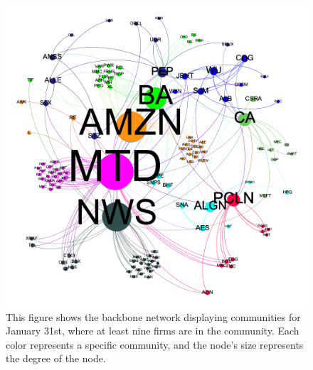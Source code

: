\begin{figure}[htb!]
  \centerline{\includegraphics[scale=0.5]{figures/EarnAnnounceTE/20180131OnlyC-curved.png}}
  \caption{This figure shows the backbone network displaying communities for January 31st, where at least nine firms are in the community.  Each color represents a specific community, and the node's size represents the degree of the node.}
  \label{fig:Community20180131}
\end{figure}

